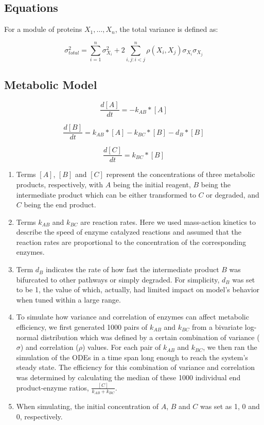 \subsection{Equations}

For a module of proteins $X_{1},\dots,X_{n}$, the total variance is defined as:

\begin{equation}\label{paper2_eq1}
\sigma_{total}^2 = \sum_{i = 1}^{n} \sigma_{X_i}^2 + 2 \sum_{i,j:i<j}^{n} \rho (X_i,X_j) \sigma_{X_i} \sigma_{X_j}
\end{equation}

\subsection{Metabolic Model}

\begin{equation}\label{paper2_eq2}
\frac{d[A]}{dt} = -k_{AB} * [A]
\end{equation}

\begin{equation}\label{paper2_eq3}
\frac{d[B]}{dt} = k_{AB} * [A] - k_{BC} * [B] - d_B * [B]
\end{equation}

\begin{equation}\label{paper2_eq4}
\frac{d[C]}{dt} = k_{BC} * [B]
\end{equation}

\begin{enumerate}
    \item Terms $[A]$, $[B]$ and $[C]$ represent the concentrations of three metabolic products, respectively, with $A$ being the initial reagent, $B$ being the intermediate product which can be either transformed to $C$ or degraded, and $C$ being the end product. 
    \item Terms $k_{AB}$ and $k_{BC}$ are reaction rates. Here we used mass-action kinetics to describe the speed of enzyme catalyzed reactions and assumed that the reaction rates are proportional to the concentration of the corresponding enzymes.
    \item Term $d_B$ indicates the rate of how fast the intermediate product $B$ was bifurcated to other pathways or simply degraded. For simplicity, $d_B$ was set to be 1, the value of which, actually, had limited impact on model’s behavior when tuned within a large range.
    \item To simulate how variance and correlation of enzymes can affect metabolic efficiency, we first generated 1000 pairs of $k_{AB}$ and $k_{BC}$ from a bivariate log-normal distribution which was defined by a certain combination of variance ($\sigma$) and correlation ($\rho$) values. For each pair of $k_{AB}$ and $k_{BC}$, we then ran the simulation of the ODEs in a time span long enough to reach the system’s steady state. The efficiency for this combination of variance and correlation was determined by calculating the median of these 1000 individual end product-enzyme ratios, $\frac{[C]}{k_{AB} + k_{BC}}$.
    \item When simulating, the initial concentration of $A$, $B$ and $C$ was set as 1, 0 and 0, respectively. 
\end{enumerate}


